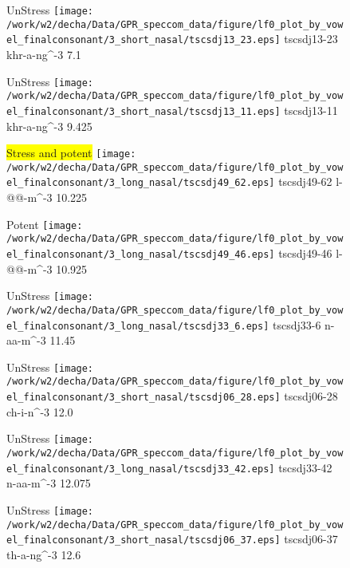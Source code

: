 \documentclass{article}
\begin{document}
\begin{figure}[t]
\begin{minipage}[b]{.24\textwidth}
UnStress
\centering
\texttt{[image: /work/w2/decha/Data/GPR\_speccom\_data/figure/lf0\_plot\_by\_vowel\_finalconsonant/3\_short\_nasal/tscsdj13\_23.eps]}
tscsdj13-23 khr-a-ng\textasciicircum-3 7.1
\end{minipage}
\begin{minipage}[b]{.24\textwidth}
UnStress
\centering
\texttt{[image: /work/w2/decha/Data/GPR\_speccom\_data/figure/lf0\_plot\_by\_vowel\_finalconsonant/3\_short\_nasal/tscsdj13\_11.eps]}
tscsdj13-11 khr-a-ng\textasciicircum-3 9.425
\end{minipage}
\begin{minipage}[b]{.24\textwidth}
\colorbox{yellow}{Stress and potent}
\centering
\texttt{[image: /work/w2/decha/Data/GPR\_speccom\_data/figure/lf0\_plot\_by\_vowel\_finalconsonant/3\_long\_nasal/tscsdj49\_62.eps]}
tscsdj49-62 l-@@-m\textasciicircum-3 10.225
\end{minipage}
\begin{minipage}[b]{.24\textwidth}
\colorbox{Apricot}{Potent}
\centering
\texttt{[image: /work/w2/decha/Data/GPR\_speccom\_data/figure/lf0\_plot\_by\_vowel\_finalconsonant/3\_long\_nasal/tscsdj49\_46.eps]}
tscsdj49-46 l-@@-m\textasciicircum-3 10.925
\end{minipage}
\end{figure}

\begin{figure}[t]
\begin{minipage}[b]{.24\textwidth}
UnStress
\centering
\texttt{[image: /work/w2/decha/Data/GPR\_speccom\_data/figure/lf0\_plot\_by\_vowel\_finalconsonant/3\_long\_nasal/tscsdj33\_6.eps]}
tscsdj33-6 n-aa-m\textasciicircum-3 11.45
\end{minipage}
\begin{minipage}[b]{.24\textwidth}
UnStress
\centering
\texttt{[image: /work/w2/decha/Data/GPR\_speccom\_data/figure/lf0\_plot\_by\_vowel\_finalconsonant/3\_short\_nasal/tscsdj06\_28.eps]}
tscsdj06-28 ch-i-n\textasciicircum-3 12.0
\end{minipage}
\begin{minipage}[b]{.24\textwidth}
UnStress
\centering
\texttt{[image: /work/w2/decha/Data/GPR\_speccom\_data/figure/lf0\_plot\_by\_vowel\_finalconsonant/3\_long\_nasal/tscsdj33\_42.eps]}
tscsdj33-42 n-aa-m\textasciicircum-3 12.075
\end{minipage}
\begin{minipage}[b]{.24\textwidth}
UnStress
\centering
\texttt{[image: /work/w2/decha/Data/GPR\_speccom\_data/figure/lf0\_plot\_by\_vowel\_finalconsonant/3\_short\_nasal/tscsdj06\_37.eps]}
tscsdj06-37 th-a-ng\textasciicircum-3 12.6
\end{minipage}
\end{figure}
\end{document}
